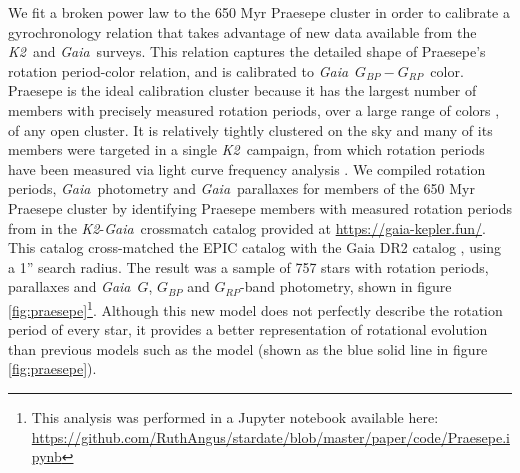 \documentclass[useAMS, usenatbib, preprint, 12pt]{aastex}
\newcommand{\Ktwo}{{\it K2}}
\newcommand{\ktwo}{\Ktwo}
\newcommand{\Gaia}{{\it Gaia}}
\newcommand{\gaia}{{\it Gaia}}
\newcommand{\gcolor}{$G_{BP} - G_{RP}$}
\begin{document}
We fit a broken power law to the 650 Myr Praesepe cluster in order to
calibrate a gyrochronology relation that takes advantage of new data available
from the \ktwo\ and \gaia\ surveys.
This relation captures the detailed shape of Praesepe's rotation period-color
relation, and is calibrated to \gaia\ \gcolor\ color.
Praesepe is the ideal calibration cluster because it has the largest number of
members with precisely measured rotation periods, over a large range of colors
\citep[spanning spectral types A0 through M6,][]{rebull2017}, of any open
cluster.
It is relatively tightly clustered on the sky and many of its members were
targeted in a single \ktwo\ campaign, from which rotation periods have been
measured via light curve frequency analysis \citep{douglas2017, rebull2017}.
We compiled rotation periods, \Gaia\ photometry and \gaia\ parallaxes for
members of the 650 Myr Praesepe cluster \citep{fossati2008} by identifying
Praesepe members with measured rotation periods from \citet{douglas2017} in
the \ktwo-\gaia\ crossmatch catalog provided at
\url{https://gaia-kepler.fun/}.
This catalog cross-matched the EPIC catalog \citep{huber2016} with the
Gaia DR2 catalog \citep{brown2018}, using a 1'' search radius.
The result was a sample of 757 stars with rotation periods, parallaxes and
\gaia\ $G$, $G_{BP}$ and $G_{RP}$-band photometry, shown in figure
\ref{fig:praesepe}\footnote{This analysis was performed in a Jupyter notebook
available here: \url{
    https://github.com/RuthAngus/stardate/blob/master/paper/code/Praesepe.ipynb}}.
Although this new model does not perfectly describe the rotation period of
every star, it provides a better representation of rotational evolution than
previous models such as the \citet{angus2015} model (shown as the blue solid
line in figure \ref{fig:praesepe}).
\end{document}
